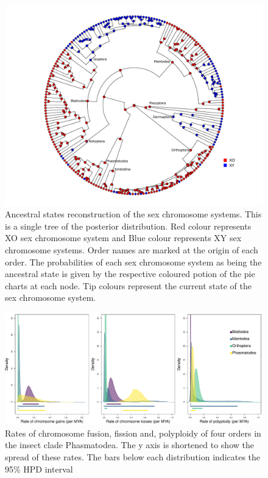 \begin{figure}
\centering \includegraphics[width=1\textwidth]{figures/sex_chrom_asr_phylogeny.pdf}
\caption{Ancestral states reconstruction of the sex chromosome systems. This is a single tree of the posterior distribution. Red colour represents XO sex chromosome system and Blue colour represents XY sex chromosome systems. Order names are marked at the origin of each order. The probabilities of each sex chromosome system as being the ancestral state is given by the respective coloured potion of the pie charts at each node. Tip colours represent the current state of the sex chromosome system.}
\label{fig:sex.asr.plot}
\end{figure}

\begin{figure}
\centering \includegraphics[width=1\textwidth]{figures/order_rates_95HPD.pdf}
\caption{Rates of chromosome fusion, fission and, polyploidy of four orders in the insect clade Phasmatodea. The y axis is shortened to show the spread of these rates. The bars below each distribution indicates the 95\% HPD interval}
\label{fig:order.rates.95HPD}
\end{figure}


